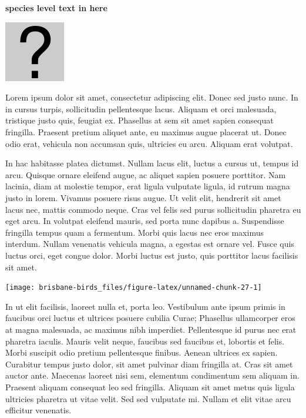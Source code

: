 \documentclass[]{book}
\let\origfigure\figure
\let\endorigfigure\endfigure
\renewenvironment{figure}[1][2] {
  \expandafter\origfigure\expandafter[H]
} {
  \endorigfigure
}
\begin{document}
\textbf{species level text in here}

\begin{figure}
\centering
\includegraphics{assets/missing.png}
\caption{No image for species}
\end{figure}

Lorem ipsum dolor sit amet, consectetur adipiscing elit. Donec sed justo
nunc. In in cursus turpis, sollicitudin pellentesque lacus. Aliquam et
orci malesuada, tristique justo quis, feugiat ex. Phasellus at sem sit
amet sapien consequat fringilla. Praesent pretium aliquet ante, eu
maximus augue placerat ut. Donec odio erat, vehicula non accumsan quis,
ultricies eu arcu. Aliquam erat volutpat.

In hac habitasse platea dictumst. Nullam lacus elit, luctus a cursus ut,
tempus id arcu. Quisque ornare eleifend augue, ac aliquet sapien posuere
porttitor. Nam lacinia, diam at molestie tempor, erat ligula vulputate
ligula, id rutrum magna justo in lorem. Vivamus posuere risus augue. Ut
velit elit, hendrerit sit amet lacus nec, mattis commodo neque. Cras vel
felis sed purus sollicitudin pharetra eu eget arcu. In volutpat eleifend
mauris, sed porta nunc dapibus a. Suspendisse fringilla tempus quam a
fermentum. Morbi quis lacus nec eros maximus interdum. Nullam venenatis
vehicula magna, a egestas est ornare vel. Fusce quis luctus orci, eget
congue dolor. Morbi luctus est justo, quis porttitor lacus facilisis sit
amet.

\begin{figure}
\texttt{[image: brisbane-birds\_files/figure-latex/unnamed-chunk-27-1]} \caption{insert figure caption}\label{fig:unnamed-chunk-27}
\end{figure}

In ut elit facilisis, laoreet nulla et, porta leo. Vestibulum ante ipsum
primis in faucibus orci luctus et ultrices posuere cubilia Curae;
Phasellus ullamcorper eros at magna malesuada, ac maximus nibh
imperdiet. Pellentesque id purus nec erat pharetra iaculis. Mauris velit
neque, faucibus sed faucibus et, lobortis et felis. Morbi suscipit odio
pretium pellentesque finibus. Aenean ultrices ex sapien. Curabitur
tempus justo dolor, sit amet pulvinar diam fringilla at. Cras sit amet
auctor ante. Maecenas laoreet nisi sem, elementum condimentum sem
aliquam in. Praesent aliquam consequat leo sed fringilla. Aliquam sit
amet metus quis ligula ultricies pharetra ut vitae velit. Sed sed
vulputate mi. Nullam et elit vitae arcu efficitur venenatis.
\end{document}
